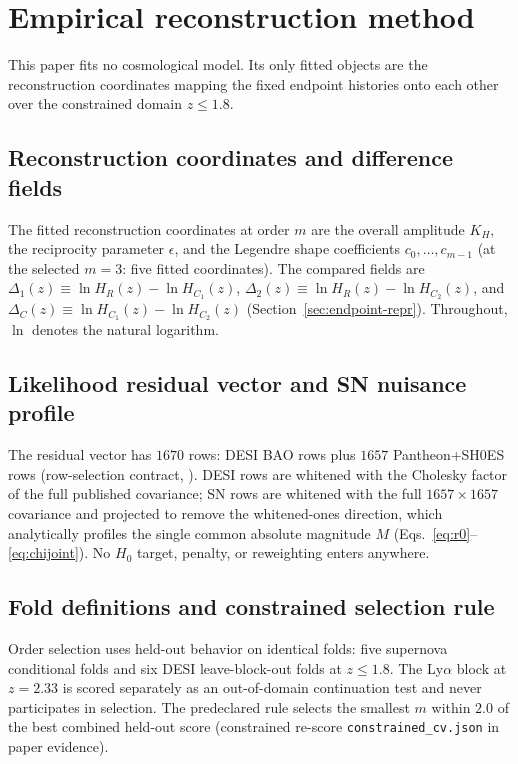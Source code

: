 \section{Empirical reconstruction method}
\label{sec:methods}

This paper fits no cosmological model. Its only fitted objects are
the reconstruction coordinates mapping the fixed endpoint histories onto
each other over the constrained domain $z\le1.8$.

\subsection{Reconstruction coordinates and difference fields}

The fitted reconstruction coordinates at order $m$ are the overall amplitude
$K_{H}$, the reciprocity parameter $\epsilon$, and the Legendre shape
coefficients $c_{0},\ldots,c_{m-1}$ (at the selected $m=3$: five fitted
coordinates). The compared fields are
$\Delta_{1}(z)\equiv\ln H_{R}(z)-\ln H_{C_{1}}(z)$,
$\Delta_{2}(z)\equiv\ln H_{R}(z)-\ln H_{C_{2}}(z)$, and
$\Delta_{C}(z)\equiv\ln H_{C_{1}}(z)-\ln H_{C_{2}}(z)$
(Section~\ref{sec:endpoint-repr}). Throughout, $\ln$ denotes the
natural logarithm.

\subsection{Likelihood residual vector and SN nuisance profile}

The residual vector has $1670$ rows: DESI BAO rows plus $1657$
Pantheon+SH0ES rows (row-selection contract,
). DESI rows are
whitened with the Cholesky factor of the full published covariance;
SN rows are whitened with the full $1657\times1657$ covariance and
projected to remove the whitened-ones direction, which analytically
profiles the single common absolute magnitude $M$
(Eqs.~\eqref{eq:r0}--\eqref{eq:chijoint}). No $H_{0}$ target, penalty,
or reweighting enters anywhere.

\subsection{Fold definitions and constrained selection rule}

Order selection uses held-out behavior on identical folds: five
supernova conditional folds and six DESI leave-block-out folds at
$z\le1.8$. The Ly$\alpha$ block at $z=2.33$ \citep{DESIDR2Lya} is scored separately as an
out-of-domain continuation test and never participates in selection.
The predeclared rule selects the smallest $m$ within $2.0$ of the
best combined held-out score
(constrained re-score \texttt{constrained\_cv.json} in paper
evidence).

